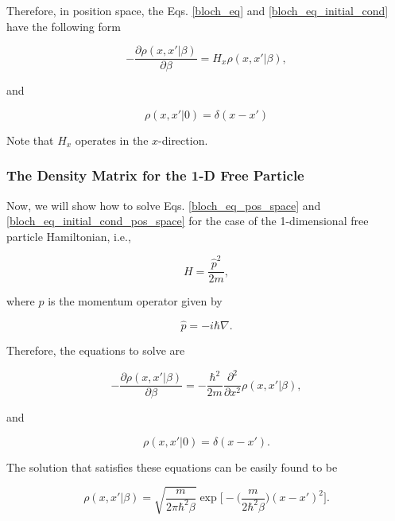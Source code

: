 \documentclass{article}
\begin{document}
Therefore, in position space, the Eqs. \ref{bloch_eq} and \ref{bloch_eq_initial_cond} have the following form

\begin{equation}\label{bloch_eq_pos_space}
    - \frac{\partial \rho(x, x' | \beta)}{\partial \beta} = H_{x} \rho(x, x' | \beta),
\end{equation}

and

\begin{equation}\label{bloch_eq_initial_cond_pos_space}
    \rho(x, x' | 0) = \delta(x-x')
\end{equation}

Note that $H_{x}$ operates in the $x$-direction.

\subsubsection{The Density Matrix for the 1-D Free Particle}
Now, we will show how to solve Eqs. \ref{bloch_eq_pos_space} and \ref{bloch_eq_initial_cond_pos_space} for the case of the 1-dimensional free particle Hamiltonian, i.e.,

\begin{equation}
    H = \frac{\hat{p}^{2}}{2m},
\end{equation}

where $\hat{p}$ is the momentum operator given by

\begin{equation}
    \hat{p} = -i\hbar \nabla.
\end{equation}

Therefore, the equations to solve are

\begin{equation}
    - \frac{\partial \rho(x, x' | \beta)}{\partial \beta} = -\frac{\hbar^{2}}{2m} \frac{\partial^{2}}{\partial x^{2}} \rho(x, x' | \beta),
\end{equation}

and

\begin{equation}
    \rho(x, x' | 0) = \delta(x-x').
\end{equation}

The solution that satisfies these equations can be easily found to be

\begin{equation}
    \rho(x, x' | \beta) = \sqrt{\frac{m}{2\pi \hbar^{2} \beta}} \exp\bigg[-\bigg(\frac{m}{2 \hbar^{2} \beta}\bigg)(x-x')^{2}\bigg].
\end{equation}
\end{document}
